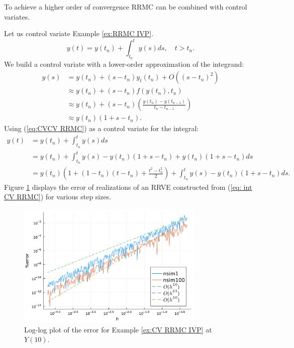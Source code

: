 \documentclass[a4paper,12pt]{article}
\begin{document}
To achieve a higher order of convergence RRMC can be combined with control variates.
\begin{example}[CV RRMC $y_t=y$]\label{ex:CV RRMC IVP}
  Let us control variate Example \ref{ex:RRMC IVP}.
  \begin{equation}
    y(t)= y(t_{n}) + \int_{t_{n}}^{t}y(s)ds , \quad t>t_{n}.
  \end{equation}
  We build a control variate with a lower-order approximation
  of the integrand:
  \begin{align}
    y(s) & = y(t_{n}) + (s-t_{n})y_t(t_{n}) + O((s-t_{n})^{2})      \\
         & \approx y(t_{n}) + (s-t_{n})f(y(t_{n}),t_{n})            \\
         & \approx y(t_{n}) +
    (s-t_{n})\left(\frac{y(t_{n})-y(t_{n-1})}{t_{n}-t_{n-1}}\right) \\
         & \approx y(t_{n})(1+s-t_{n}). \label{eq:CVCV RRMC}
  \end{align}
  Using (\ref{eq:CVCV RRMC}) as a control variate for the integral:
  \begin{align}
    y(t) & = y(t_{n}) + \int_{t_{n}}^{t}y(s)ds                                          \\
         & = y(t_{n}) + \int_{t_{n}}^{t}y(s)-y(t_{n})(1+s-t_{n}) +y(t_{n})(1+s-t_{n})ds \\
         & = y(t_{n})\left(1 + (1-t_{n})(t-t_{n})+\frac{t^{2}-t_{n}^{2}}{2}\right)
    + \int_{t_{n}}^{t}y(s)-y(t_{n})(1+s-t_{n})ds. \label{eq: int CV RRMC}
  \end{align}
  Figure \ref{fig:CV RRMC IVP} displays the error
  of realizations of an RRVE constructed from (\ref{eq: int CV RRMC})
  for various step sizes.

  \begin{figure}[h!]
    \centering
    \includegraphics[width=0.8\textwidth]{julia_plots/CV_RRMC_IVP.pdf}
    \caption{Log-log plot of the error for Example
      \ref{ex:CV RRMC IVP} at $Y(10)$.}
    \label{fig:CV RRMC IVP}
  \end{figure}
\end{example}
\end{document}
